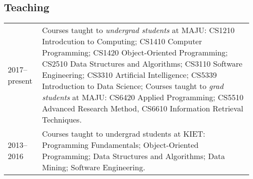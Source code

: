 \documentclass[a4paper, 10pt]{article}
\begin{document}
\subsection*{\textcolor{NavyBlue}{Teaching}}
{
\tabcolsep=4pt
\begin{tabular}{lp{16cm}}
2017--present & Courses taught to {\it undergrad students} at MAJU: CS1210 Introdcution to Computing; CS1410 Computer Programming; CS1420 Object-Oriented Programming; CS2510 Data Structures and Algorithms; CS3110 Software Engineering; CS3310 Artificial Intelligence; CS5339 Introduction to Data Science;
\newline Courses taught to {\it grad students} at MAJU: CS6420 Applied Programming; CS5510 Advanced Research Method, CS6610 Information Retrieval Techniques.\\
2013--2016 & Courses taught to undergrad students at KIET: Programming Fundamentals; Object-Oriented Programming; Data Structures and Algorithms; Data Mining; Software Engineering.
\end{tabular}
}
\end{document}
